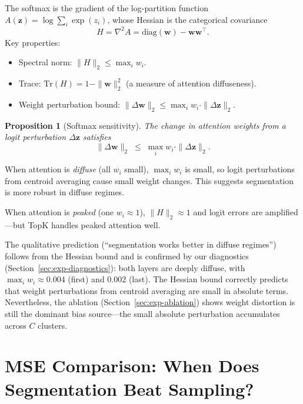 \documentclass[11pt,a4paper]{article}
\newtheorem{proposition}[theorem]{Proposition}
\theoremstyle{definition}
\newcommand{\ww}{\mathbf{w}}
\newcommand{\zz}{\mathbf{z}}
\newcommand{\Tr}{\mathrm{Tr}}
\newcommand{\diag}{\mathrm{diag}}
\begin{document}
The softmax is the gradient of the log-partition function
$A(\zz) = \log\sum_i\exp(z_i)$, whose Hessian is the categorical covariance
\begin{equation}\label{eq:hessian}
  H = \nabla^2 A = \diag(\ww) - \ww\ww^{\!\top}.
\end{equation}
Key properties:
\begin{itemize}[nosep]
  \item Spectral norm: $\|H\|_2 \le \max_i w_i$.
  \item Trace: $\Tr(H) = 1-\|\ww\|_2^2$ (a measure of attention diffuseness).
  \item Weight perturbation bound:
    $\|\Delta\ww\|_2 \le \max_i w_i\cdot\|\Delta\zz\|_2$.
\end{itemize}

\begin{proposition}[Softmax sensitivity]\label{prop:sensitivity}
The change in attention weights from a logit perturbation $\Delta\zz$ satisfies
\[
  \|\Delta\ww\|_2 \;\le\; \max_i w_i \cdot \|\Delta\zz\|_2.
\]
\end{proposition}

When attention is \emph{diffuse} (all $w_i$ small), $\max_i w_i$ is small,
so logit perturbations from centroid averaging cause small weight changes.
This suggests segmentation is more robust in diffuse regimes.

When attention is \emph{peaked} (one $w_i\approx 1$),
$\|H\|_2\approx 1$ and logit errors are amplified---but TopK handles
peaked attention well.

\begin{researchnote}
The qualitative prediction (``segmentation works better in diffuse regimes'')
follows from the Hessian bound and is confirmed by our diagnostics
(Section~\ref{sec:exp-diagnostics}): both layers are deeply diffuse, with
$\max_i w_i \approx 0.004$ (first) and $0.002$ (last).
The Hessian bound correctly predicts that weight perturbations from centroid
averaging are small in absolute terms.  Nevertheless, the ablation
(Section~\ref{sec:exp-ablation}) shows weight distortion is still the dominant
bias source---the small absolute perturbation accumulates across $C$ clusters.
\end{researchnote}


\section{MSE Comparison: When Does Segmentation Beat Sampling?}
\label{sec:mse}
\end{document}
